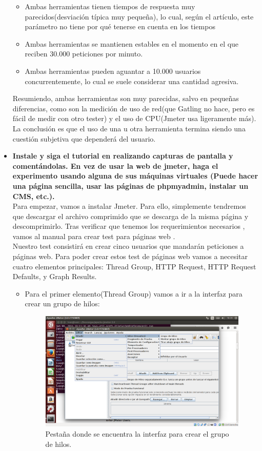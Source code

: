 \begin{itemize}
\begin{itemize}
		\item Ambas herramientas tienen tiempos de respuesta muy parecidos(desviación típica muy pequeña), lo cual, según el artículo, este parámetro no tiene por qué tenerse en cuenta en los tiempos 
		\item Ambas herramientas se mantienen estables en el momento en el que reciben 30.000 peticiones por minuto.
		\item Ambas herramientas pueden aguantar a 10.000 usuarios concurrentemente, lo cual se suele considerar una cantidad agresiva.
	\end{itemize}
	
	Resumiendo, ambas herramientas son muy parecidas, salvo en pequeñas diferencias, como son la medición de uso de red(que Gatling no hace, pero es fácil de medir con otro tester) y el uso de CPU(Jmeter usa ligeramente más). La conclusión es que el uso de una u otra herramienta termina siendo una cuestión subjetiva que dependerá del usuario.
	
	
	\item \textbf{Instale y siga el tutorial en \cite{Jmeter} realizando capturas de pantalla y comentándolas. En vez de usar la web de jmeter, haga el experimento usando alguna de sus máquinas virtuales (Puede hacer una página sencilla, usar las páginas de phpmyadmin, instalar un CMS, etc.).}\\
	
	Para empezar, vamos a instalar Jmeter. Para ello, simplemente tendremos que descargar el archivo comprimido que se descarga de la misma página \cite{Jmeter} y descomprimirlo. Tras verificar que tenemos los requerimientos necesarios \cite{Jmeter2}, vamos al manual para crear test para páginas web \cite{Jmeter3}.\\
	
	Nuestro test consistirá en crear cinco usuarios que mandarán peticiones a páginas web. Para poder crear estos test de páginas web vamos a necesitar cuatro elementos principales: Thread Group, HTTP Request, HTTP Request Defaults, y Graph Results.\\
	
	\begin{itemize}
		\item Para el primer elemento(Thread Group) vamos a ir a la interfaz para crear un grupo de hilos:\\
		\begin{figure}[H]
			\centering
			\includegraphics[width=0.7\linewidth]{ThreadGroup}
			\caption[Pestaña]{Pestaña donde se encuentra la interfaz para crear el grupo de hilos.}
			\label{fig:ThreadGroup}
		\end{figure}
		

\end{itemize}
\end{itemize}
